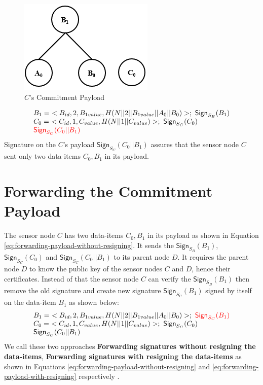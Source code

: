			\begin{figure}[h!]
				\centering
				\includegraphics[scale = 1]{images/commitment-payload-of-C.png}
				\caption{$C$'s Commitment Payload}
				\label{fig:Commitment payload of C}
			\end{figure}
		\begin{equation}	
			\begin{array}{l}
				B_{1} =\ <B_{id}, 2, B_{1value}, H(N||2||B_{1value}||A_{0}||B_{0})>;\ \textsf{Sign}_{S_{B}}(B_{1})\\
				C_{0} =\ <C_{id}, 1, C_{value}, H(N||1||C_{value})>;\ \textsf{Sign}_{S_{C}}(C_{0})\\
				\textcolor{red}{\textsf{Sign}_{S_{C}}(C_{0}||B_{1})}
			\end{array}
			\label{eq:forwarding-payload-without-resigning}
		\end{equation}
	Signature on the $C$'s payload $\textsf{Sign}_{S_{C}}(C_{0}||B_{1})$ assures that the sensor node $C$ sent only two data-items $C_{0},B_{1}$ in its payload.
\section{Forwarding the Commitment Payload}	
	The sensor node $C$ has two data-items $C_{0},B_{1}$ in its payload as shown in Equation \ref{eq:forwarding-payload-without-resigning}. 
	It sends the $\textsf{Sign}_{S_{B}}(B_{1})$, $\textsf{Sign}_{S_{C}}(C_{0}) $ and $\textsf{Sign}_{S_{C}}(C_{0}||B_{1})$ to its parent node $D$.
	It requires the parent node $D$ to know the public key of the sensor nodes $C$ and $D$, hence their certificates.
	Instead of that the sensor node $C$ can verify the $\textsf{Sign}_{S_{B}}(B_{1})$ then remove the old signature and create new signature $\textsf{Sign}_{S_{C}}(B_{1})$ signed by itself on the data-item $B_{1}$ as shown below:
\begin{equation}	
	\begin{array}{l}
		B_{1} =\ <B_{id}, 2, B_{1value}, H(N||2||B_{1value}||A_{0}||B_{0})>;\  \textcolor{red}{\textsf{Sign}_{S_{C}}(B_{1})}\\
		C_{0} =\ <C_{id}, 1, C_{value}, H(N||1||C_{value})>;\ \textsf{Sign}_{S_{C}}(C_{0})\\
		\textsf{Sign}_{S_{C}}(C_{0}||B_{1})
	\end{array}
	\label{eq:forwarding-payload-with-resigning}
\end{equation}
We call these two approaches \textbf{Forwarding signatures without resigning the data-items}, \textbf{Forwarding signatures with resigning the data-items} as shown in Equations \ref{eq:forwarding-payload-without-resigning} and \ref{eq:forwarding-payload-with-resigning} respectively .

